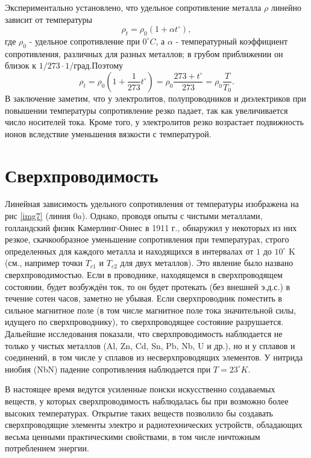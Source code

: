 \documentclass[a4paper,10pt]{book}
\begin{document}
Экспериментально установлено, что удельное сопротивление металла $\rho$ линейно зависит от температуры
\begin{equation}\label{168}
 \rho_t = \rho_0(1 + \alpha t^\circ),
\end{equation}
где $\rho_0$ - удельное сопротивление при $0^\circ C$, а $\alpha$ - температурный коэффициент сопротивления, различных для разных металлов;
в грубом приближении он близок к $1/273\cdot1/\text{град}$.Поэтому
\begin{equation}\label{168a}
 \rho_t = \rho_0(1 + \frac{1}{273}t^\circ) = \rho_0 \frac{273 + t^\circ}{273} = \rho_0\frac{T}{T_0}.
\end{equation}
В заключение заметим, что у электролитов, полупроводников и диэлектриков при повышении температуры сопротивление резко падает, так как увеличивается
число носителей тока. Кроме того, у электролитов резко возрастает подвижность ионов вследствие уменьшения вязкости с температурой.
\section{Сверхпроводимость}
Линейная зависимость удельного сопротивления от температуры изображена на рис \ref{img7} (линия $0a$).
Однако, проводя опыты с чистыми металлами,
голландский физик Камерлинг-Оннес в 1911 г., обнаружил у некоторых из них резкое, скачкообразное уменьшение сопротивления при температурах,
строго определенных для каждого металла и находящихся в интервалах от $1$ до $10^\circ$ K (см., например точки $T_{c1}$ и $T_{c2}$ для двух
металлов). Это явление было названо сверхпроводимостью. Если в проводнике, находящемся в сверхпроводящем состоянии, будет возбуждён ток,
то он будет протекать (без внешней э.д.с.) в течение сотен часов, заметно не убывая. Если сверхпроводник поместить в сильное магнитное поле 
(в том числе магнитное поле тока значительной силы, идущего по сверхпроводнику), то сверхпроводящее состояние разрушается. Дальейшие исследования
показали, что сверхпроводимость наблюдается не только у чистых металлов (Al, Zn, Cd, Sn, Pb, Nb, U и др.), но и у сплавов и соединений, в 
том числе у сплавов из несверхпроводящих элементов. У нитрида ниобия (NbN) падение сопротивления наблюдается при $T = 23^\circ K$.

В настоящее время ведутся усиленные поиски искусственно создаваемых веществ, у которых сверхпроводимость наблюдалась бы при возможно более
высоких температурах. Открытие таких веществ позволило бы создавать сверхпроводящие элементы электро и радиотехнических устройств, обладающих
весьма ценными практическими свойствами, в том числе ничтожным потреблением энергии.
\end{document}
